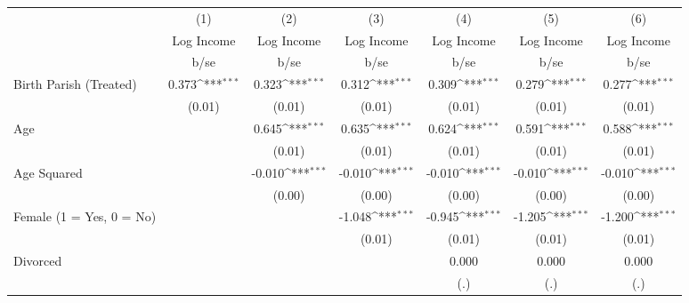 {
\def\sym#1{\ifmmode^{#1}\else\(^{#1}\)\fi}
\begin{tabular}{l*{6}{c}}
\hline\hline
                    &\multicolumn{1}{c}{(1)}&\multicolumn{1}{c}{(2)}&\multicolumn{1}{c}{(3)}&\multicolumn{1}{c}{(4)}&\multicolumn{1}{c}{(5)}&\multicolumn{1}{c}{(6)}\\
                    &\multicolumn{1}{c}{Log Income}&\multicolumn{1}{c}{Log Income}&\multicolumn{1}{c}{Log Income}&\multicolumn{1}{c}{Log Income}&\multicolumn{1}{c}{Log Income}&\multicolumn{1}{c}{Log Income}\\
                    &        b/se         &        b/se         &        b/se         &        b/se         &        b/se         &        b/se         \\
\hline
Birth Parish (Treated)&       0.373\sym{***}&       0.323\sym{***}&       0.312\sym{***}&       0.309\sym{***}&       0.279\sym{***}&       0.277\sym{***}\\
                    &      (0.01)         &      (0.01)         &      (0.01)         &      (0.01)         &      (0.01)         &      (0.01)         \\
Age                 &                     &       0.645\sym{***}&       0.635\sym{***}&       0.624\sym{***}&       0.591\sym{***}&       0.588\sym{***}\\
                    &                     &      (0.01)         &      (0.01)         &      (0.01)         &      (0.01)         &      (0.01)         \\
Age Squared         &                     &      -0.010\sym{***}&      -0.010\sym{***}&      -0.010\sym{***}&      -0.010\sym{***}&      -0.010\sym{***}\\
                    &                     &      (0.00)         &      (0.00)         &      (0.00)         &      (0.00)         &      (0.00)         \\
Female (1 = Yes, 0 = No)&                     &                     &      -1.048\sym{***}&      -0.945\sym{***}&      -1.205\sym{***}&      -1.200\sym{***}\\
                    &                     &                     &      (0.01)         &      (0.01)         &      (0.01)         &      (0.01)         \\
Divorced            &                     &                     &                     &       0.000         &       0.000         &       0.000         \\
                    &                     &                     &                     &         (.)         &         (.)         &         (.)         \\

\end{tabular}}
